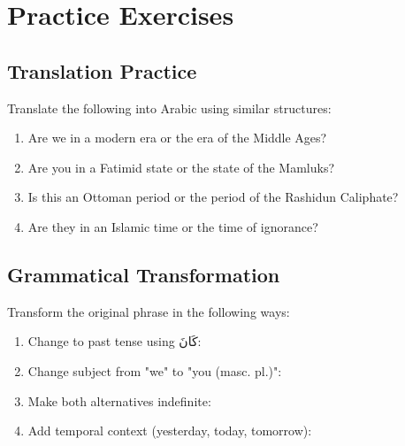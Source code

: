 \documentclass[letterpaper,12pt]{article}
\begin{document}
\section{Practice Exercises}

\subsection{Translation Practice}

Translate the following into Arabic using similar structures:

\begin{enumerate}
\item Are we in a modern era or the era of the Middle Ages?
\vspace{2em}

\item Are you in a Fatimid state or the state of the Mamluks?
\vspace{2em}

\item Is this an Ottoman period or the period of the Rashidun Caliphate?
\vspace{2em}

\item Are they in an Islamic time or the time of ignorance?
\vspace{2em}
\end{enumerate}

\subsection{Grammatical Transformation}

Transform the original phrase in the following ways:

\begin{enumerate}
\item Change to past tense using \textarabic{كَانَ}:
\vspace{2em}

\item Change subject from "we" to "you (masc. pl.)":
\vspace{2em}

\item Make both alternatives indefinite:
\vspace{2em}

\item Add temporal context (yesterday, today, tomorrow):
\vspace{2em}
\end{enumerate}
\end{document}
